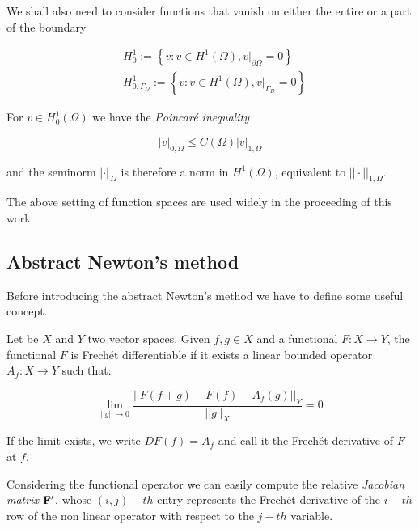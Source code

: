 We shall also need to consider functions that vanish on either the entire or a part of the boundary

\begin{align}
& H^1_0 :=  \left\{   v : v \in H^1(\Omega), v|_{\partial \Omega} = 0\right\} \label{space: h1 zero} \\
& H^1_{0,\Gamma_D} :=  \left\{   v : v \in H^1(\Omega), v|_{\Gamma_D} = 0\right\} \label{space: h1 zero gamma}
\end{align} 

For $v \in H^1_0(\Omega)$ we have the \textit{Poincar\'e inequality}

\begin{equation}
\label{eq: poincarre inequality}
|v|_{0,\Omega} \leq C(\Omega) |v|_{1,\Omega}
\end{equation}

and the seminorm $|\cdot |_{\,\Omega}$ is therefore a norm in $H^1(\Omega)$, equivalent to $||\cdot ||_{1,\Omega}$.

The above setting of function spaces are used widely in the proceeding of this work. 


\subsection{Abstract Newton's method}

Before introducing the abstract Newton's method we have to define some useful concept.

\begin{Definizione}
Let be $X$ and $Y$ two vector spaces. Given $f,g \in X$ and a functional $F:X\rightarrow Y$, the functional $F$ is Frech\'et differentiable if it exists a linear bounded operator $A_f:X\rightarrow Y$ such that:

\begin{equation}
\lim_{||g||\to 0}\dfrac{||F(f+g)-F(f)-A_f(g)||_Y}{||g||_X} = 0 
\end{equation}

If the limit exists, we write $DF(f)=A_f$ and call it the Frech\'et derivative of $F$ at $f$.
\end{Definizione}


Considering the functional operator  we can easily compute the relative \textit{Jacobian matrix} $\mathbf{F}'$, whose $(i,j)-th$ entry represents the Frech\'et derivative of the $i-th$ row of the non linear operator with respect to the $j-th$ variable.

